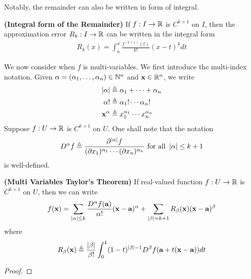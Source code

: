 \documentclass{report}
\begin{document}
\begin{mdframed}
Notably, the remainder can also be written in form of integral. 
\end{mdframed}
\begin{theorem}
\textbf{(Integral form of the Remainder)} If $f:I\rightarrow \mathbb{R}$ is $C^{k+1}$ on $I$, then the approximation error $R_k:I\rightarrow \mathbb{R}$ can be written in the integral form 
\begin{align*}
R_k(x)=\int_a^x \frac{f^{(k+1)}(t)}{k!}(x-t)^k dt
\end{align*}
\end{theorem}
\begin{mdframed}
We now consider when $f$ is multi-variables. We first introduce the multi-index notation. Given $\alpha = (\alpha_1,\dots ,\alpha _n)\in\mathbb{N}^n$ and $\textbf{x}\in\mathbb{R}^n$, we write 
\begin{align*}
  \left|\alpha \right|&\triangleq  \alpha_1 + \cdots + \alpha_n  \\
  \alpha !&\triangleq \alpha_1 !\cdots \alpha_n! \\
  \textbf{x}^\alpha & \triangleq x_1^{\alpha_1}\cdots x_n ^{\alpha_n}
\end{align*}
Suppose $f:U\rightarrow \mathbb{R}$ is $C^{k+1}$ on  $U$. One shall note that the notation 
\begin{align*}
D^{\alpha }f\triangleq  \frac{\partial ^{\left|\alpha \right|}f}{(\partial x_1)^{\alpha _1}\cdots (\partial x_n)^{\alpha_n}} \text{ for all }\left|\alpha \right|\leq k+1
\end{align*}
is well-defined. 
\end{mdframed}
\begin{theorem}
\label{Multi Taylor}
\textbf{(Multi Variables Taylor's Theorem)} If real-valued function $f:U\rightarrow \mathbb{R}$ is $C^{k+1}$ on $U$, then we can write 
\begin{align*}
f(\textbf{x})=\sum_{\left|\alpha \right|\leq k} \frac{D^{\alpha }f(\textbf{a})}{\alpha !}(\textbf{x}-\textbf{a})^{\alpha }+ \sum_{\left|\beta \right|=k+1} R_\beta (\textbf{x})(\textbf{x}-\textbf{a})^{\beta }
\end{align*}
where 
\begin{align*}
R_\beta (\textbf{x})\triangleq \frac{\left|\beta \right|}{\beta !}\int_0^1 (1-t)^{\left|\beta \right| -1}D^{\beta }f(\textbf{a}+t (\textbf{x}-\textbf{a}))dt 
\end{align*}
\end{theorem}
\begin{proof}

\end{proof}
\end{document}
